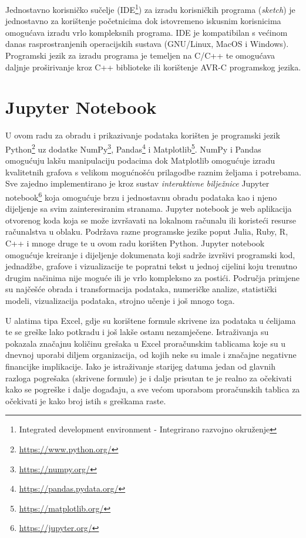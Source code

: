 Jednostavno korisničko sučelje (IDE\footnote{Integrated development environment - Integrirano razvojno okruženje}) za izradu korisničkih programa (\textit{sketch}) je jednostavno za korištenje početnicima dok istovremeno iskusnim korisnicima omogućava izradu vrlo kompleksnih programa.
IDE je kompatibilan s većinom danas rasprostranjenih operacijskih sustava (GNU/Linux, MacOS i Windows).
Programski jezik za izradu programa je temeljen na C/C++ te omogućava daljnje proširivanje kroz C++ biblioteke ili korištenje AVR-C programskog jezika.

\section{Jupyter Notebook}
U ovom radu za obradu i prikazivanje podataka korišten je programski jezik Python\footnote{\url{https://www.python.org/}} uz dodatke NumPy\footnote{\url{https://numpy.org/}}, Pandas\footnote{\url{https://pandas.pydata.org/}} i Matplotlib\footnote{\url{https://matplotlib.org/}}.
NumPy i Pandas omogućuju lakšu manipulaciju podacima dok Matplotlib omogućuje izradu kvalitetnih grafova s velikom mogućnošću prilagodbe raznim željama i potrebama.
Sve zajedno implementirano je kroz sustav \emph{interaktivne bilježnice} Jupyter notebook\footnote{\url{https://jupyter.org/}} koja omogućuje brzu i jednostavnu obradu podataka kao i njeno dijeljenje sa svim zainteresiranim stranama.
Jupyter notebook je web aplikacija otvorenog koda koja se može izvršavati na lokalnom računalu ili koristeći resurse računalstva u oblaku.
Podržava razne programske jezike poput Julia, Ruby, R, C++ i mnoge druge te u ovom radu korišten Python.
Jupyter notebook omogućuje kreiranje i dijeljenje dokumenata koji sadrže izvršivi programski kod, jednadžbe, grafove i vizualizacije te popratni tekst u jednoj cijelini koju trenutno drugim načinima nije moguće ili je vrlo kompleksno za postići.
Područja primjene su najčešće obrada i transformacija podataka, numeričke analize, statistički modeli, vizualizacija podataka, strojno učenje i još mnogo toga.

U alatima tipa Excel, gdje su korištene formule skrivene iza podataka u ćelijama te se greške lako potkradu i još lakše ostanu nezamječene. 
Istraživanja su pokazala značajnu količinu grešaka u Excel proračunskim tablicama koje su u dnevnoj uporabi diljem organizacija, od kojih neke su imale i značajne negativne financijke implikacije\cite{panko1998we}. 
Iako je istraživanje starijeg datuma jedan od glavnih razloga pogrešaka (skrivene formule) je i dalje prisutan te je realno za očekivati kako se pogreške i dalje događaju, a sve većom uporabom proračunskih tablica za očekivati je kako broj istih s greškama raste.

